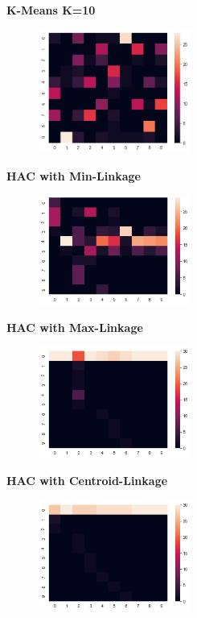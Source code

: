 \documentclass[submit]{harvardml}
\begin{document}
\begin{enumerate}
    \textbf{K-Means K=10}
    \begin{figure}[H]
        \includegraphics[width=5cm]{hw4/img/p2_8a.png}
        \centering
    \end{figure}
    \textbf{HAC with Min-Linkage}
    \begin{figure}[H]
        \includegraphics[width=5cm]{hw4/img/p2_8b.png}
        \centering
    \end{figure}
    \textbf{HAC with Max-Linkage}
    \begin{figure}[H]
        \includegraphics[width=5cm]{hw4/img/p2_8c.png}
        \centering
    \end{figure}
    \textbf{HAC with Centroid-Linkage}
    \begin{figure}[H]
        \includegraphics[width=5cm]{hw4/img/p2_8d.png}
        \centering
    \end{figure}
    
    
\end{enumerate}
\end{document}
